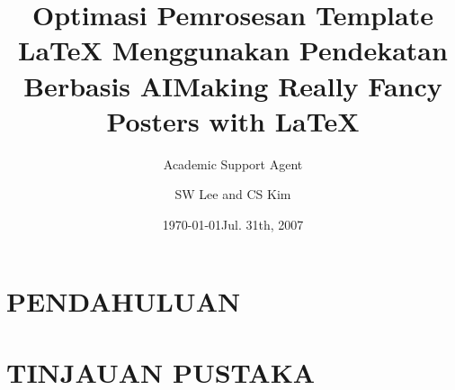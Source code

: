 \documentclass{beamer}
\title{Optimasi Pemrosesan Template LaTeX Menggunakan Pendekatan Berbasis AI}
\author{Academic Support Agent}
\date{\today}
\begin{document}
\maketitle

\begin{abstract}

\end{abstract}

\chapter{PENDAHULUAN}


\chapter{TINJAUAN PUSTAKA}


  {
  }
  \usepackage{times}
  \usepackage{amsmath,amsthm, amssymb, latexsym}
  \boldmath
  \usepackage[english]{babel}
  \usepackage[latin1]{inputenc}
  \usepackage[orientation=portrait,size=a0,scale=1.4,debug]{beamerposter}
  \usepackage{lipsum}

  \graphicspath{{figures/}}
  \title[Fancy Posters]{Making Really Fancy Posters with \LaTeX}
  \author[Goo \& Lee]{SW Lee and CS Kim}
  \date{Jul. 31th, 2007}
\end{document}
